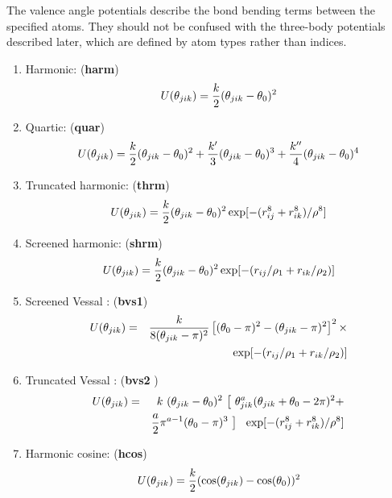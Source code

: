 The valence angle potentials
describe the bond bending terms between the specified atoms.  They
should not be confused with the
three-body potentials described later,
which are defined by atom types rather than indices.
\begin{enumerate}
\item Harmonic:  ({\bf harm})
\begin{equation}
 U(\theta_{jik}) = {k \over 2} (\theta_{jik} - \theta_0)^{2}
\end{equation}
\item Quartic:  ({\bf quar})
\begin{equation}
 U(\theta_{jik}) = {k \over 2}(\theta_{jik} - \theta_0)^{2} + {k' \over
3}(\theta_{jik} - \theta_0)^{3} + {k'' \over 4}(\theta_{jik} -
\theta_0)^{4}
\end{equation}
\item Truncated harmonic:  ({\bf thrm})
\begin{equation}
U(\theta_{jik}) = {k\over 2} (\theta_{jik} - \theta_0)^{2}
\exp[-(r_{ij}^{8} + r_{ik}^{8}) / \rho^{8}]
\end{equation}
\item Screened harmonic:  ({\bf shrm})
\begin{equation}
 U(\theta_{jik}) = {k\over 2} (\theta_{jik} - \theta_0)^{2}
\exp[-(r_{ij} / \rho_1 + r_{ik} / \rho_2)]
\end{equation}
\item Screened Vessal \cite{vessal-94a}:  ({\bf bvs1})
\begin{eqnarray}
U(\theta_{jik})&=&{k \over 8(\theta_{jik}-\pi)^{2}} \left[ (\theta_0
-\pi)^{2} -(\theta_{jik}-\pi)^{2}\right]^{2} \times \nonumber \\
              & &  \exp[-(r_{ij} / \rho_1 + r_{ik} / \rho_2)]
\end{eqnarray}
\item Truncated Vessal \cite{smith-95a}:  ({\bf bvs2 })
\begin{eqnarray}
U(\theta_{jik})&=& k~(\theta_{jik}-\theta_{0})^{2}~
\big[~\theta_{jik}^a (\theta_{jik}+\theta_{0}-2\pi)^{2} + \nonumber \\
& & {a \over 2} \pi^{a-1} (\theta_{0}-\pi)^{3}~\big]~~\exp[-(r_{ij}^{8} + r_{ik}^{8}) / \rho^{8}]
\end{eqnarray}
\item Harmonic cosine:  ({\bf hcos})
\begin{equation}
U(\theta_{jik}) = {k\over 2}(\cos(\theta_{jik})
-\cos(\theta_{0}))^{2}

\end{equation}
\end{enumerate}
